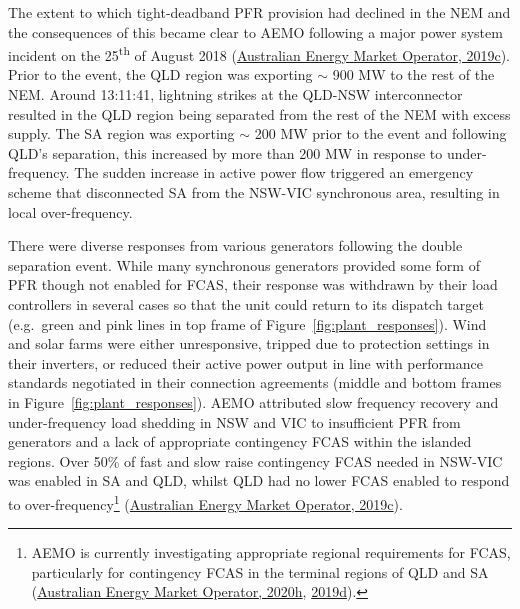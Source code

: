 \documentclass[12pt,a4paper,]{report}
\begin{document}
The extent to which tight-deadband PFR provision had declined in the NEM
and the consequences of this became clear to AEMO following a major
power system incident on the 25\textsuperscript{th} of August 2018
(\protect\hyperlink{ref-australianenergymarketoperatorFinalReportQueensland2019}{Australian
Energy Market Operator, 2019c}). Prior to the event, the QLD region was
exporting \(\sim\) 900 MW to the rest of the NEM. Around 13:11:41,
lightning strikes at the QLD-NSW interconnector resulted in the QLD
region being separated from the rest of the NEM with excess supply. The
SA region was exporting \(\sim\) 200 MW prior to the event and following
QLD's separation, this increased by more than 200 MW in response to
under-frequency. The sudden increase in active power flow triggered an
emergency scheme that disconnected SA from the NSW-VIC synchronous area,
resulting in local over-frequency.

There were diverse responses from various generators following the
double separation event. While many synchronous generators provided some
form of PFR though not enabled for FCAS, their response was withdrawn by
their load controllers in several cases so that the unit could return to
its dispatch target (e.g.~green and pink lines in top frame of
Figure~\ref{fig:plant_responses}). Wind and solar farms were either
unresponsive, tripped due to protection settings in their inverters, or
reduced their active power output in line with performance standards
negotiated in their connection agreements (middle and bottom frames in
Figure~\ref{fig:plant_responses}). AEMO attributed slow frequency
recovery and under-frequency load shedding in NSW and VIC to
insufficient PFR from generators and a lack of appropriate contingency
FCAS within the islanded regions. Over 50\% of fast and slow raise
contingency FCAS needed in NSW-VIC was enabled in SA and QLD, whilst QLD
had no lower FCAS enabled to respond to over-frequency\footnote{AEMO is
  currently investigating appropriate regional requirements for FCAS,
  particularly for contingency FCAS in the terminal regions of QLD and
  SA
  (\protect\hyperlink{ref-australianenergymarketoperatorRenewableIntegrationStudy2020b}{Australian
  Energy Market Operator, 2020h},
  \protect\hyperlink{ref-australianenergymarketoperatorElectricityRuleChange2019a}{2019d}).}
(\protect\hyperlink{ref-australianenergymarketoperatorFinalReportQueensland2019}{Australian
Energy Market Operator, 2019c}).
\end{document}
